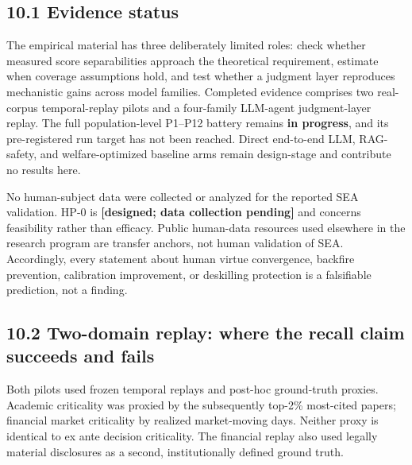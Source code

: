 \documentclass[
  11pt]{article}
\begin{document}
\subsection{10.1 Evidence status}\label{evidence-status}

The empirical material has three deliberately limited roles: check whether measured score separabilities approach the theoretical requirement, estimate when coverage assumptions hold, and test whether a judgment layer reproduces mechanistic gains across model families. Completed evidence comprises two real-corpus temporal-replay pilots and a four-family LLM-agent judgment-layer replay. The full population-level P1--P12 battery remains \textbf{in progress}, and its pre-registered run target has not been reached. Direct end-to-end LLM, RAG-safety, and welfare-optimized baseline arms remain design-stage and contribute no results here.

No human-subject data were collected or analyzed for the reported SEA validation. HP-0 is \textbf{{[}designed; data collection pending{]}} and concerns feasibility rather than efficacy. Public human-data resources used elsewhere in the research program are transfer anchors, not human validation of SEA. Accordingly, every statement about human virtue convergence, backfire prevention, calibration improvement, or deskilling protection is a falsifiable prediction, not a finding.

\subsection{10.2 Two-domain replay: where the recall claim succeeds and fails}\label{two-domain-replay-where-the-recall-claim-succeeds-and-fails}

Both pilots used frozen temporal replays and post-hoc ground-truth proxies. Academic criticality was proxied by the subsequently top-2\% most-cited papers; financial market criticality by realized market-moving days. Neither proxy is identical to ex ante decision criticality. The financial replay also used legally material disclosures as a second, institutionally defined ground truth.
\end{document}
